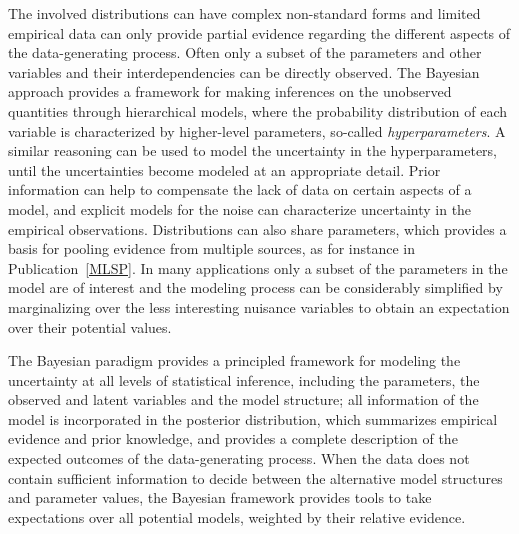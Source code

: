 The involved distributions can have complex non-standard forms and
limited empirical data can only provide partial evidence regarding the
different aspects of the data-generating process.  Often only a subset
of the parameters and other variables and their interdependencies can
be directly observed. The Bayesian approach provides a framework for
making inferences on the unobserved quantities through hierarchical
models, where the probability distribution of each variable is
characterized by higher-level parameters, so-called {\it
hyperparameters}. A similar reasoning can be used to model the
uncertainty in the hyperparameters, until the uncertainties become
modeled at an appropriate detail. Prior information can help to
compensate the lack of data on certain aspects of a model, and
explicit models for the noise can characterize uncertainty in the
empirical observations. Distributions can also share parameters, which
provides a basis for pooling evidence from multiple sources, as for
instance in Publication~\ref{MLSP}. In many applications only a subset
of the parameters in the model are of interest and the modeling
process can be considerably simplified by marginalizing over the less
interesting nuisance variables to obtain an expectation over their
potential values. 

The Bayesian paradigm provides a principled framework for modeling the
uncertainty at all levels of statistical inference, including the
parameters, the observed and latent variables and the model structure;
all information of the model is incorporated in the posterior
distribution, which summarizes empirical evidence and prior knowledge,
and provides a complete description of the expected outcomes of the
data-generating process. When the data does not contain sufficient
information to decide between the alternative model structures and
parameter values, the Bayesian framework provides tools to take
expectations over all potential models, weighted by their relative
evidence.


